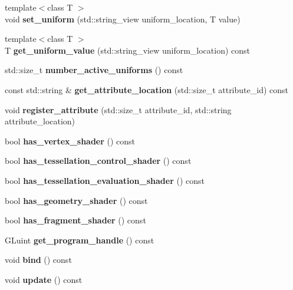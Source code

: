 \begin{DoxyCompactItemize}
{\footnotesize template$<$class T $>$ }\\void {\bfseries set\+\_\+uniform} (std\+::string\+\_\+view uniform\+\_\+location, T value)
\item 
\mbox{\label{class_shader_abe853f6bf34c1bd33f00226256441a4f}} 
{\footnotesize template$<$class T $>$ }\\T {\bfseries get\+\_\+uniform\+\_\+value} (std\+::string\+\_\+view uniform\+\_\+location) const
\item 
\mbox{\label{class_shader_a220b3e1f3e5a5ddd0ebec6d29a226b1c}} 
std\+::size\+\_\+t {\bfseries number\+\_\+active\+\_\+uniforms} () const
\item 
\mbox{\label{class_shader_af097dd4e2fa1b4de25653b5664df2d90}} 
const std\+::string \& {\bfseries get\+\_\+attribute\+\_\+location} (std\+::size\+\_\+t attribute\+\_\+id) const
\item 
\mbox{\label{class_shader_a0d447622b2992d6afb9ecffb03001010}} 
void {\bfseries register\+\_\+attribute} (std\+::size\+\_\+t attribute\+\_\+id, std\+::string attribute\+\_\+location)
\item 
\mbox{\label{class_shader_a12c6e9080d0bb7724f74fada01ba15a4}} 
bool {\bfseries has\+\_\+vertex\+\_\+shader} () const
\item 
\mbox{\label{class_shader_a2fda1d97a463c555bcab9a73f0beb50d}} 
bool {\bfseries has\+\_\+tessellation\+\_\+control\+\_\+shader} () const
\item 
\mbox{\label{class_shader_a3d27c58417eb3ecec859dffeca8fe97d}} 
bool {\bfseries has\+\_\+tessellation\+\_\+evaluation\+\_\+shader} () const
\item 
\mbox{\label{class_shader_aea8532f5a9ceda124eaebc71c3b1cf51}} 
bool {\bfseries has\+\_\+geometry\+\_\+shader} () const
\item 
\mbox{\label{class_shader_a4ee397617c153c826fd3e0b168409362}} 
bool {\bfseries has\+\_\+fragment\+\_\+shader} () const
\item 
\mbox{\label{class_shader_a08d212f84d03990079f2e11a1f744f26}} 
G\+Luint {\bfseries get\+\_\+program\+\_\+handle} () const
\item 
\mbox{\label{class_shader_aadbc0ca0d899238d547f87f19461dfeb}} 
void {\bfseries bind} () const
\item 
\mbox{\label{class_shader_a52b26fbffa9c135cae1ee81b553c1ad4}} 
void {\bfseries update} () const
\end{DoxyCompactItemize}


